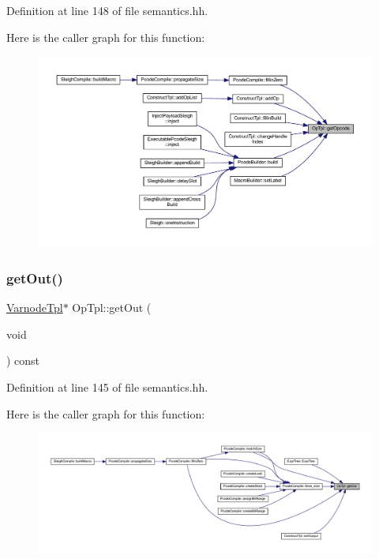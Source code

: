 Definition at line 148 of file semantics.\+hh.

Here is the caller graph for this function\+:
\nopagebreak
\begin{figure}[H]
\begin{center}
\leavevmode
\includegraphics[width=350pt]{class_op_tpl_aa553f6070fcf500f8d24af5f8e9f5da2_icgraph}
\end{center}
\end{figure}
\mbox{\label{class_op_tpl_a043e955d86d8133fbc7606c08bcb0194}} 
\subsubsection{\texorpdfstring{getOut()}{getOut()}}
{\footnotesize\ttfamily \mbox{\hyperlink{class_varnode_tpl}{Varnode\+Tpl}}$\ast$ Op\+Tpl\+::get\+Out (\begin{DoxyParamCaption}\item[{void}]{ }\end{DoxyParamCaption}) const\hspace{0.3cm}{\ttfamily [inline]}}



Definition at line 145 of file semantics.\+hh.

Here is the caller graph for this function\+:
\nopagebreak
\begin{figure}[H]
\begin{center}
\leavevmode
\includegraphics[width=350pt]{class_op_tpl_a043e955d86d8133fbc7606c08bcb0194_icgraph}
\end{center}
\end{figure}
\mbox{\label{class_op_tpl_a4eef0c979a1d23e5e761102ad6530fb6}} 
